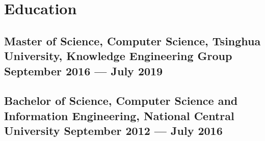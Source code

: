 \section{Education}
\subsection*{Master of Science, Computer Science, {\normalsize \normalfont Tsinghua University, Knowledge Engineering Group} \hfill September 2016 --- July 2019} 
\vspace{0.1cm}
\subsection*{Bachelor of Science, Computer Science and Information Engineering, {\normalsize \normalfont National Central University} \hfill September 2012 --- July 2016} 
\vspace{0.2cm}